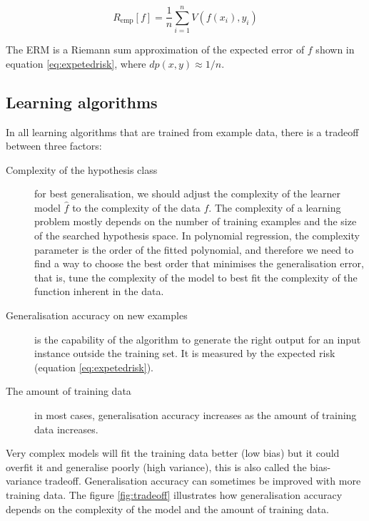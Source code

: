 \begin{equation} 
\label{eq:erm}
R_{\text{emp}}[f] = \frac{1}{n} \sum_{i=1}^n V(f(x_i),y_i)
\end{equation}

The ERM is a Riemann sum approximation of the expected error of $f$ shown in equation \ref{eq:expetedrisk}, where $dp(x,y) \approx 1/n$.

\subsection{Learning algorithms}
In all learning algorithms that are trained from example data, there is a tradeoff \cite{dietterich2003} between three factors:
\begin{description}
\item[Complexity of the hypothesis class] for best generalisation, we should adjust the complexity of the learner model $\hat{f}$ to the complexity of the data $f$. The complexity of a learning problem mostly depends on the number of training examples and the size of the searched hypothesis space. In polynomial regression, the complexity parameter is the order of the fitted polynomial, and therefore we need to find a way to choose the best order that minimises the generalisation error, that is, tune the complexity of the model to best fit the complexity of the function inherent in the data.
\item[Generalisation accuracy on new examples] is the capability of the algorithm to generate the right output for an input instance outside the training set. It is measured by the expected risk (equation \ref{eq:expetedrisk}).
\item[The amount of training data]  in most cases, generalisation accuracy increases as the amount of training data increases.
\end{description}

Very complex models will fit the training data better (low bias) but it could overfit it and generalise poorly (high variance), this is also called the bias-variance tradeoff.  Generalisation accuracy can sometimes be improved with more training data. The figure \ref{fig:tradeoff} illustrates how generalisation accuracy depends on the complexity of the model and the amount of training data.

